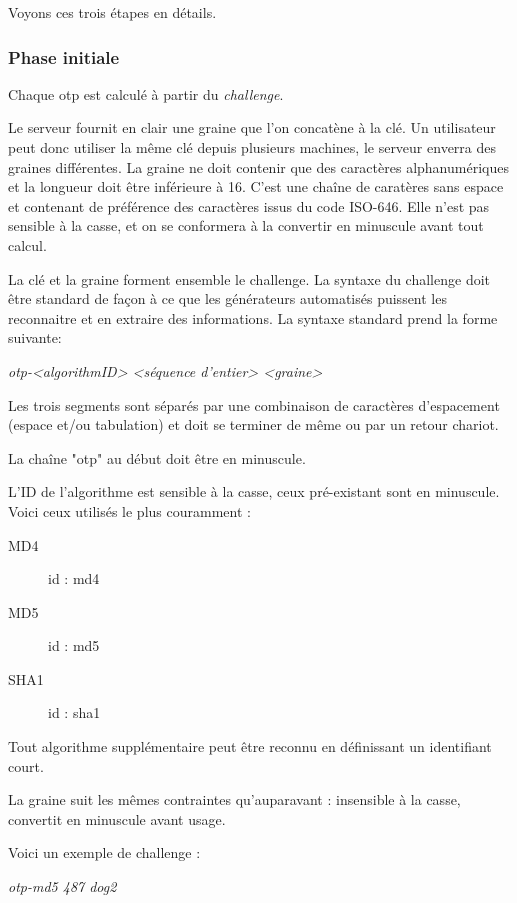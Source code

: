 \documentclass{../res/univ-projet}
\begin{document}
    Voyons ces trois étapes en détails.

    \subsubsection{Phase initiale}
      Chaque otp est calculé à partir du \emph{challenge}.

      Le serveur fournit en clair une graine que l'on concatène à la clé. Un 
utilisateur peut donc utiliser la même clé depuis plusieurs machines, le serveur 
enverra des graines différentes. La graine ne doit contenir que des caractères 
alphanumériques et la longueur doit être inférieure à 16. C'est une chaîne de 
caratères sans espace et contenant de préférence des caractères issus du code 
ISO-646. Elle n'est pas sensible à la casse, et on se conformera à la convertir 
en minuscule avant tout calcul.

      La clé et la graine forment ensemble le challenge. La syntaxe du challenge
doit être standard de façon à ce que les générateurs automatisés puissent les 
reconnaitre et en extraire des informations. La syntaxe standard prend la forme 
suivante:
      \begin{center}
          \emph{otp-<algorithmID> <séquence d'entier> <graine>}\\
      \end{center}

      Les trois segments sont séparés par une combinaison de caractères 
d'espacement (espace et/ou tabulation) et doit se terminer de même ou par un 
retour chariot. 

      La chaîne "otp" au début doit être en minuscule.

      L'ID de l'algorithme est sensible à la casse, ceux pré-existant sont en 
      minuscule. Voici ceux utilisés le plus couramment :
      \begin{description}
          \item [MD4] id : md4
          \item [MD5] id : md5
          \item [SHA1] id : sha1 
      \end{description}
      Tout algorithme supplémentaire peut être reconnu en définissant un 
identifiant court.

      La graine suit les mêmes contraintes qu'auparavant : insensible à la 
    casse, convertit en minuscule avant usage.

      Voici un exemple de challenge :
      \begin{center}
          \emph{otp-md5 487 dog2 }\\ 
      \end{center}
\end{document}
